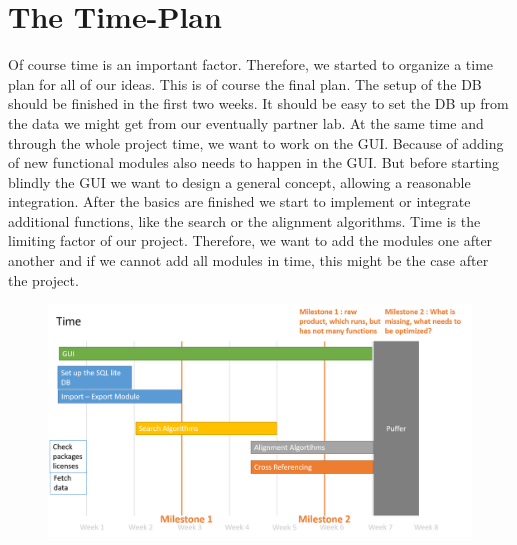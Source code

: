 \documentclass[]{article}
\begin{document}
\section{ The Time-Plan}
Of course time is an important factor. Therefore, we started to organize a time plan for all of our ideas. This is of course the final plan. The setup of the DB should be finished in the first two weeks. It should be easy to set the DB up from the data we might get from our eventually partner lab. At the same time and through the whole project time, we want to work on the GUI. Because of adding of new functional modules also needs to happen in the GUI. But before starting blindly the GUI we want to design a general concept, allowing a reasonable integration. After the basics are finished we start to implement or integrate additional functions, like the search or the alignment algorithms. Time is the limiting factor of our project. Therefore, we want to add the modules one after another and if we cannot add all modules in time, this might be the case after the project.
  
	\begin{figure}[h]
		\includegraphics[width=\textwidth]{../img/Time.png}
	\end{figure}
\end{document}
